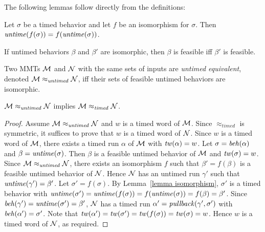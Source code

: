 The following lemmas follow directly from the definitions:
\begin{lemma}
\label{lemma isomorphism}
Let $\sigma$ be a timed behavior and let $f$ be an isomorphism for $\sigma$.
Then $\mathit{untime}(f(\sigma)) = f(\mathit{untime}(\sigma))$.
\end{lemma}
\begin{lemma}
If untimed behaviors $\beta$ and $\beta'$ are isomorphic, then $\beta$ is feasible iff $\beta'$ is feasible.
\end{lemma}

\fi
Two MMTs ${\cal M}$ and ${\cal N}$ with the same sets of inputs are \emph{untimed equivalent}, denoted ${\cal M} \approx_{\mathit{untimed}} {\cal N}$, iff their sets of feasible untimed behaviors are isomorphic.

\begin{theorem}
\label{untimedimpliestimed}
${\cal M} \approx_{\mathit{untimed}} {\cal N}$
implies
${\cal M} \approx_{\mathit{timed}} {\cal N}$.
\end{theorem}
\iflong
\begin{proof}
Assume ${\cal M} \approx_{\mathit{untimed}} {\cal N}$ and $w$ is a timed word of ${\cal M}$.
Since $\approx_{\mathit{timed}}$ is symmetric, it suffices to prove that $w$ is a timed word of ${\cal N}$.
Since $w$ is a timed word of ${\cal M}$,
there exists a timed run $\alpha$ of ${\cal M}$ with $\mathit{tw}(\alpha) = w$. 
Let $\sigma = \mathit{beh}(\alpha)$ and $\beta = \mathit{untime}(\sigma)$. 
Then $\beta$ is a feasible untimed behavior of ${\cal M}$ and $\mathit{tw}(\sigma) = w$.
Since  ${\cal M} \approx_{\mathit{untimed}} {\cal N}$, there exists an isomorphism $f$ such that 
$\beta' = f(\beta)$ is a feasible untimed behavior of ${\cal N}$.
Hence ${\cal N}$ has an untimed run $\gamma'$ such that $\mathit{untime}(\gamma') = \beta'$.
Let $\sigma' = f(\sigma)$.
By Lemma~\ref{lemma isomorphism}, $\sigma'$ is a timed behavior with 
$\mathit{untime}(\sigma') = \mathit{untime}(f(\sigma)) = f(\mathit{untime}(\sigma)) = f(\beta) = \beta'$.
Since $\mathit{beh}(\gamma') = \mathit{untime}(\sigma') = \beta'$, ${\cal N}$ has a timed run $\alpha' = \mathit{pullback}(\gamma',\sigma')$ with
$\mathit{beh}(\alpha') = \sigma'$.
Note that $\mathit{tw}(\alpha') = \mathit{tw}(\sigma') = \mathit{tw}(f(\sigma)) = \mathit{tw}(\sigma) = w$.
Hence $w$ is a timed word of ${\cal N}$, as required.
\end{proof}
\fi

